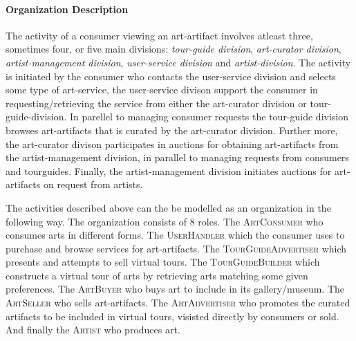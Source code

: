 \documentclass[paper=letter, fontsize=12pt]{article}
\begin{document}
\paragraph{Organization Description}
The activity of a consumer viewing an art-artifact involves atleast three, sometimes four, or five main divisions: \textit{tour-guide division}, \textit{art-curator division}, \textit{artist-management division}, \textit{user-service division} and \textit{artist-division}.
The activity is initiated by the  consumer who contacts the user-service division and selects some type of art-service, the user-service divison support the consumer in requesting/retrieving the service from either the art-curator division or tour-guide-division. In parellel to managing consumer requests the tour-guide division browses art-artifacts that is curated by the art-curator division. Further more, the art-curator divison participates in auctions for obtaining art-artifacts from the artist-management division, in parallel to managing requests from consumers and tourguides. Finally, the artist-management division initiates auctions for art-artifacts on request from artists.

The activities described above can the be modelled as an organization in the following way. The organization consists of $8$ roles. The \textsc{ArtConsumer} who consumes arts in different forms. The \textsc{UserHandler} which the consumer uses to purchase and browse services for art-artifacts. The \textsc{TourGuideAdvertiser} which presents and attempts to sell virtual tours. The \textsc{TourGuideBuilder} which constructs a virtual tour of arts by retrieving arts matching some given preferences. The \textsc{ArtBuyer} who buys art to include in its gallery/museum. The \textsc{ArtSeller} who sells art-artifacts. The \textsc{ArtAdvertiser} who promotes the curated artifacts to be included in virtual tours, visisted directly by consumers or sold. And finally the \textsc{Artist} who produces art.
\end{document}
